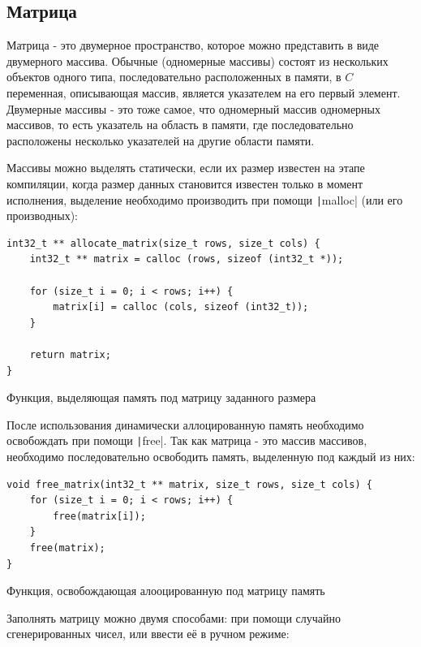 \documentclass[a4paper]{article}
\begin{document}
  \subsection{Матрица}

  Матрица - это двумерное пространство, которое можно представить в виде двумерного массива.
  Обычные (одномерные массивы) состоят из нескольких объектов одного типа, последовательно
  расположенных в памяти, в $C$ переменная, описывающая массив, является указателем на его первый элемент.
  Двумерные массивы - это тоже самое, что одномерный массив одномерных массивов,
  то есть указатель на область в памяти, где последовательно расположены несколько
  указателей на другие области памяти.

  Массивы можно выделять статически, если их размер известен на этапе компиляции,
  когда размер данных становится известен только в момент исполнения, выделение необходимо
  производить при помощи \texttt|malloc| (или его производных):
  \begin{listing}[H]
    \begin{verbatim}
int32_t ** allocate_matrix(size_t rows, size_t cols) {
    int32_t ** matrix = calloc (rows, sizeof (int32_t *));

    for (size_t i = 0; i < rows; i++) {
        matrix[i] = calloc (cols, sizeof (int32_t));
    }

    return matrix;
}
    \end{verbatim}
    \caption{Функция, выделяющая память под матрицу заданного размера}
  \end{listing}

  После использования динамически аллоцированную память необходимо освобождать при помощи
  \texttt|free|. Так как матрица - это массив массивов, необходимо последовательно
  освободить память, выделенную под каждый из них:
  \begin{listing}[H]
    \begin{verbatim}
void free_matrix(int32_t ** matrix, size_t rows, size_t cols) {
    for (size_t i = 0; i < rows; i++) {
        free(matrix[i]);
    }
    free(matrix);
}
    \end{verbatim}
    \caption{Функция, освобождающая алооцированную под матрицу память}
  \end{listing}

  Заполнять матрицу можно двумя способами: при помощи случайно сгенерированных
  чисел, или ввести её в ручном режиме:
\end{document}
